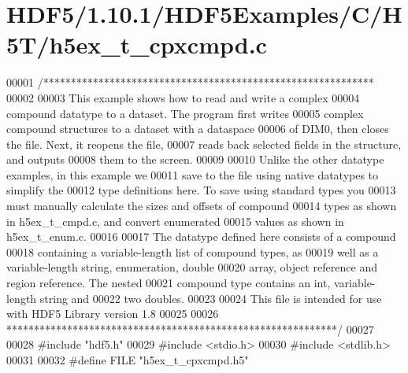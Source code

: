 \hypertarget{_h_d_f5_21_810_81_2_h_d_f5_examples_2_c_2_h5_t_2h5ex__t__cpxcmpd_8c_source}{}\section{H\+D\+F5/1.10.1/\+H\+D\+F5\+Examples/\+C/\+H5\+T/h5ex\+\_\+t\+\_\+cpxcmpd.c}
\label{_h_d_f5_21_810_81_2_h_d_f5_examples_2_c_2_h5_t_2h5ex__t__cpxcmpd_8c_source}

\begin{DoxyCode}
00001 \textcolor{comment}{/************************************************************}
00002 \textcolor{comment}{}
00003 \textcolor{comment}{  This example shows how to read and write a complex}
00004 \textcolor{comment}{  compound datatype to a dataset.  The program first writes}
00005 \textcolor{comment}{  complex compound structures to a dataset with a dataspace}
00006 \textcolor{comment}{  of DIM0, then closes the file.  Next, it reopens the file,}
00007 \textcolor{comment}{  reads back selected fields in the structure, and outputs}
00008 \textcolor{comment}{  them to the screen.}
00009 \textcolor{comment}{}
00010 \textcolor{comment}{  Unlike the other datatype examples, in this example we}
00011 \textcolor{comment}{  save to the file using native datatypes to simplify the}
00012 \textcolor{comment}{  type definitions here.  To save using standard types you}
00013 \textcolor{comment}{  must manually calculate the sizes and offsets of compound}
00014 \textcolor{comment}{  types as shown in h5ex\_t\_cmpd.c, and convert enumerated}
00015 \textcolor{comment}{  values as shown in h5ex\_t\_enum.c.}
00016 \textcolor{comment}{}
00017 \textcolor{comment}{  The datatype defined here consists of a compound}
00018 \textcolor{comment}{  containing a variable-length list of compound types, as}
00019 \textcolor{comment}{  well as a variable-length string, enumeration, double}
00020 \textcolor{comment}{  array, object reference and region reference.  The nested}
00021 \textcolor{comment}{  compound type contains an int, variable-length string and}
00022 \textcolor{comment}{  two doubles.}
00023 \textcolor{comment}{}
00024 \textcolor{comment}{  This file is intended for use with HDF5 Library version 1.8}
00025 \textcolor{comment}{}
00026 \textcolor{comment}{ ************************************************************/}
00027 
00028 \textcolor{preprocessor}{#include "hdf5.h"}
00029 \textcolor{preprocessor}{#include <stdio.h>}
00030 \textcolor{preprocessor}{#include <stdlib.h>}
00031 
00032 \textcolor{preprocessor}{#define FILE            "h5ex\_t\_cpxcmpd.h5"}

\end{DoxyCode}
